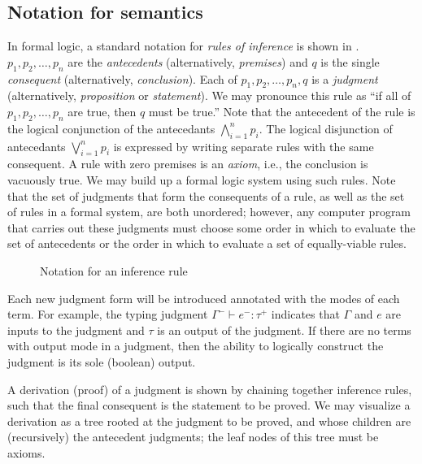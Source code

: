 \subsection{Notation for semantics}
\label{sec:semantics-notation}
In formal logic, a standard notation for \textit{rules of inference} is shown in . $p_1,p_2,\dots,p_n$ are the \textit{antecedents} (alternatively, \textit{premises}) and $q$ is the single \textit{consequent} (alternatively, \textit{conclusion}). Each of $p_1,p_2,\dots,p_n,q$ is a \textit{judgment} (alternatively, \textit{proposition} or \textit{statement}). We may pronounce this rule as ``if all of $p_1,p_2,\dots,p_n$ are true, then $q$ must be true.'' Note that the antecedent of the rule is the logical conjunction of the antecedants $\bigwedge_{i=1}^n p_i$. The logical disjunction of antecedants $\bigvee_{i=1}^n p_i$ is expressed by writing separate rules with the same consequent. A rule with zero premises is an \textit{axiom}, i.e., the conclusion is vacuously true. We may build up a formal logic system using such rules. Note that the set of judgments that form the consequents of a rule, as well as the set of rules in a formal system, are both unordered; however, any computer program that carries out these judgments must choose some order in which to evaluate the set of antecedents or the order in which to evaluate a set of equally-viable rules.

\begin{figure}
  \centering
  \begin{mdframed}
    \begin{singlespace}
      
    \end{singlespace}
  \end{mdframed}
  \caption{Notation for an inference rule}
  \label{fig:sample-inference-rule}
\end{figure}

Each new judgment form will be introduced annotated with the modes of each term. For example, the typing judgment $\Gamma^-\vdash e^-:\tau^+$ indicates that $\Gamma$ and $e$ are inputs to the judgment and $\tau$ is an output of the judgment. If there are no terms with output mode in a judgment, then the ability to logically construct the judgment is its sole (boolean) output.

A derivation (proof) of a judgment is shown by chaining together inference rules, such that the final consequent is the statement to be proved. We may visualize a derivation as a tree rooted at the judgment to be proved, and whose children are (recursively) the antecedent judgments; the leaf nodes of this tree must be axioms.

